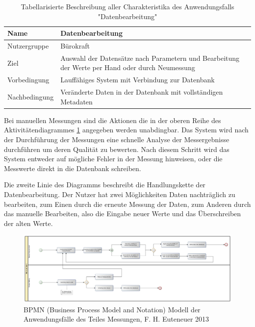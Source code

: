 \begin{table}[H]
\centering
\begin{tabular}{l | p{11cm}}
Name & Datenbearbeitung\\ \hline 
Nutzergruppe & Bürokraft\\ \hline 
Ziel & Auswahl der Datensätze nach Parametern und Bearbeitung der Werte per Hand oder durch Neumessung\\ \hline 
Vorbedingung & Lauffähiges System mit Verbindung zur Datenbank\\ \hline 
Nachbedingung & Veränderte Daten in der Datenbank mit vollständigen Metadaten\\ 
\end{tabular}
\caption{Tabellarisierte Beschreibung aller Charakteristika des Anwendungsfalls "Datenbearbeitung"} 
\label{table:use case description of "Edit data"}
\end{table}

Bei manuellen Messungen sind die Aktionen die in der oberen Reihe des Aktivitätendiagrammes \ref{fig:bpmn_use-case_measuring} angegeben werden unabdingbar. Das System wird nach der Durchführung der Messungen eine schnelle Analyse der Messergebnisse durchführen um deren Qualität zu bewerten. Nach diesem Schritt wird das System entweder auf mögliche Fehler in der Messung hinweisen, oder die Messwerte direkt in die Datenbank schreiben. 

Die zweite Linie des Diagramms beschreibt die Handlungskette der Datenbearbeitung. Der Nutzer hat zwei Möglichkeiten Daten nachträglich zu bearbeiten, zum Einen durch die erneute Messung der Daten, zum Anderen durch das manuelle Bearbeiten, also die Eingabe neuer Werte und das Überschreiben der alten Werte. 

\begin{figure}[H]
	\centering
 	 \includegraphics[scale=0.24]{graphics/bpmn_use-cases_measurement.jpg} 
	\caption{BPMN (Business Process Model and Notation) Modell der Anwendungsfälle des Teiles Messungen, F. H. Euteneuer 2013}
	 \label{fig:bpmn_use-case_measuring}
\end{figure}

